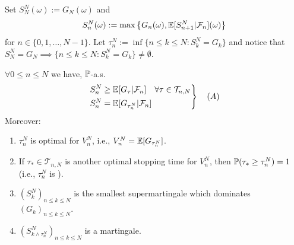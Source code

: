 Set $S_N^N(\omega) := G_N(\omega)$ and 
$$S_n^N(\omega) := \max \left\{ G_n(\omega), \mathbb E[S_{n+1}^N | \mathcal{F}_n](\omega) \right\}$$
for $n \in \{0, 1, \dots, N-1\}$. Let $\tau_n^N := \inf \{n \le k \le N : S_k^N = G_k\}$ and notice that $S_N^N = G_N \implies \{n \le k \le N : S_k^N = G_k\} \neq \emptyset$.

\begin{theorem}[OS1]
    $\forall 0 \le n \le N$ we have, $\mathbb P$-a.s.
    \begin{equation} \label{eq:A}
        \left.
        \begin{aligned}
            S_n^N &\ge \mathbb E[G_\tau | \mathcal{F}_n] \quad \forall \tau \in \mathcal{T}_{n,N} \\
            S_n^N &= \mathbb E[G_{\tau_n^N} | \mathcal{F}_n]
        \end{aligned}
        \right\} \quad (A)
    \end{equation}
    Moreover:
    \begin{enumerate}[label=(\roman*)]
        \item $\tau_n^N$ is optimal for $V_n^N$, i.e., $V_n^N = \mathbb E[G_{\tau_n^N}]$.
        \item If $\tau_* \in \mathcal{T}_{n,N}$ is another optimal stopping time for $V_n^N$, then $\mathbb P(\tau_* \ge \tau_n^N) = 1$ (i.e., $\tau_n^N$ is ).
        \item $(S_k^N)_{n \le k \le N}$ is the smallest supermartingale which dominates $(G_k)_{n \le k \le N}$.
        \item $(S_{k \wedge \tau_n^N}^N)_{n \le k \le N}$ is a martingale.
    \end{enumerate}
\end{theorem}

